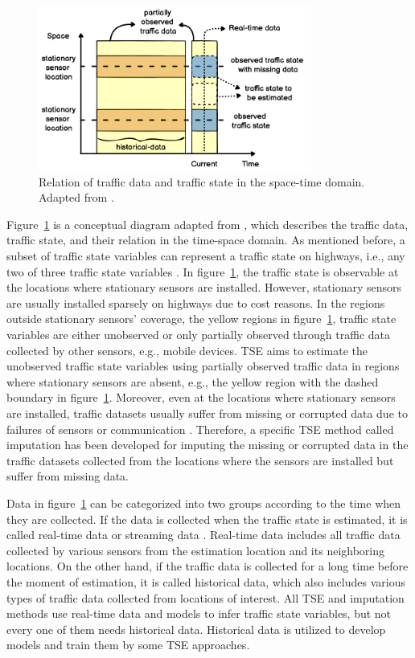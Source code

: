 \documentclass[english]{kththesis}
\begin{document}
\begin{figure}[!ht]
    \centering
    \includegraphics[width=0.8\textwidth]{tse_diagram.png}
    \caption{Relation of traffic data and traffic state in the space-time domain. Adapted from \cite{seo_tse}.}
    \label{fig:tse}
\end{figure}

Figure~\ref{fig:tse} is a conceptual diagram adapted from \cite{seo_tse}, which describes the traffic data, traffic state, and their relation in the time-space domain. As mentioned before, a subset of traffic state variables can represent a traffic state on highways, i.e., any two of three traffic state variables \cite{seo_tse}. In figure~\ref{fig:tse}, the traffic state is observable at the locations where stationary sensors are installed. However, stationary sensors are usually installed sparsely on highways due to cost reasons. In the regions outside stationary sensors' coverage, the yellow regions in figure~\ref{fig:tse}, traffic state variables are either unobserved or only partially observed through traffic data collected by other sensors, e.g., mobile devices. TSE aims to estimate the unobserved traffic state variables using partially observed traffic data in regions where stationary sensors are absent, e.g., the yellow region with the dashed boundary in figure~\ref{fig:tse}. Moreover, even at the locations where stationary sensors are installed, traffic datasets usually suffer from missing or corrupted data due to failures of sensors or communication \cite{duan_dl_imputation, chen_imputation_regression}. Therefore, a specific TSE method called imputation has been developed for imputing the missing or corrupted data in the traffic datasets collected from the locations where the sensors are installed but suffer from missing data.

Data in figure~\ref{fig:tse} can be categorized into two groups according to the time when they are collected. If the data is collected when the traffic state is estimated, it is called real-time data or streaming data \cite{seo_tse}. Real-time data includes all traffic data collected by various sensors from the estimation location and its neighboring locations. On the other hand, if the traffic data is collected for a long time before the moment of estimation, it is called historical data, which also includes various types of traffic data collected from locations of interest. All TSE and imputation methods use real-time data and models to infer traffic state variables, but not every one of them needs historical data. Historical data is utilized to develop models and train them by some TSE approaches.
\end{document}
